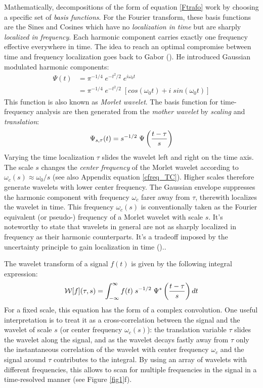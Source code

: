 Mathematically, decompositions of the form of equation \ref{Ftrafo} work by choosing a specific set of \textit{basis functions}. For the Fourier transform, these basis functions are the Sines and Cosines which have no \textit{localization in time} but are sharply \textit{localized in frequency}. Each harmonic component carries exactly one frequency effective everywhere in time. The idea to reach an optimal compromise between time and frequency localization goes back to Gabor (\cite{Gabor1946}). He introduced Gaussian modulated harmonic components:
\begin{align}
  \Psi(t) &= \pi^{-1/4} \; e^{-t^2/2} \; e^{i\omega_0 t}\\
  &= \pi^{-1/4} \; e^{-t^2/2} \; \left[cos(\omega_0 t) + i\; sin(\omega_0 t) \right]
\end{align}
This function is also known as \textit{Morlet wavelet}. The basis function for time-frequency analysis are then generated from the \textit{mother wavelet} by \textit{scaling} and \textit{translation}:
\begin{equation}
  \Psi_{s,\tau}(t) = s^{-1/2}\;\Psi \left(\frac{t - \tau}{s}\right)
\end{equation}
Varying the time localization $\tau$ slides the wavelet left and right on the time axis. The scale $s$ changes the \textit{center frequency} of the Morlet wavelet according to $\omega_c(s) \approx \omega_0/s$ (see also Appendix equation \ref{cfreq_TC}). Higher scales therefore generate wavelets with lower center frequency. The Gaussian envelope suppresses the harmonic component with frequency $\omega_c$ farer away from $\tau$, therewith localizes the wavelet in time. This frequency $\omega_c(s)$ is conventionally taken as the Fourier equivalent (or pseudo-) frequency of a Morlet wavelet with scale $s$. It's noteworthy to state that wavelets in general are not as sharply localized in frequency as their harmonic counterparts. It's a tradeoff imposed by the uncertainty principle to gain localization in time (\cite{Groechenig2013})..

The wavelet transform of a signal $f(t)$ is given by the following integral expression:
\begin{equation}
\label{Wtrafo}
\mathcal{W}[f](\tau, s) = \int_{-\infty}^{\infty} f(t) \; s^{-1/2} \;
                    \Psi^* \left(\frac{t - \tau}{s} \right) dt
\end{equation}    
For a fixed scale, this equation has the form of a complex convolution. One useful interpretation is to treat it as a cross-correlation between the signal and the wavelet of scale $s$ (or center frequency $\omega_c(s)$): the translation variable $\tau$ slides the wavelet along the signal, and as the wavelet decays fastly away from $\tau$ only the instantaneous correlation of the wavelet with center frequency $\omega_c$ and the signal around $\tau$ contributes to the integral. By using an array of wavelets with different frequencies, this allows to scan for multiple frequencies in the signal in a time-resolved manner (see Figure \ref{fig1}f). 

